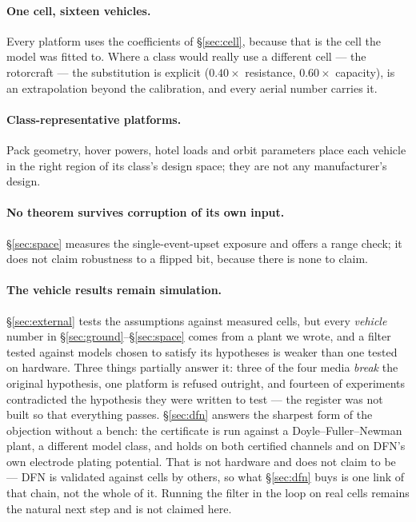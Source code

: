 \documentclass[11pt,letterpaper]{article}
\theoremstyle{definition}
\theoremstyle{remark}
\begin{document}
\paragraph{One cell, sixteen vehicles.} Every platform uses the coefficients of
\S\ref{sec:cell}, because that is the cell the model was fitted to. Where a class would really
use a different cell --- the rotorcraft --- the substitution is explicit ($0.40\times$
resistance, $0.60\times$ capacity), is an extrapolation beyond the calibration, and every aerial
number carries it.

\paragraph{Class-representative platforms.} Pack geometry, hover powers, hotel loads and orbit
parameters place each vehicle in the right region of its class's design space; they are not any
manufacturer's design.

\paragraph{No theorem survives corruption of its own input.} \S\ref{sec:space} measures the
single-event-upset exposure and offers a range check; it does not claim robustness to a flipped
bit, because there is none to claim.

\paragraph{The vehicle results remain simulation.} \S\ref{sec:external} tests the assumptions
against measured cells, but every \emph{vehicle} number in \S\ref{sec:ground}--\S\ref{sec:space}
comes from a plant we wrote, and a filter tested against models chosen to satisfy its hypotheses
is weaker than one tested on hardware. Three things partially answer it: three of the four media
\emph{break} the original hypothesis, one platform is refused outright, and fourteen of
\vExperiments{} experiments contradicted the hypothesis they were written to test --- the
register was not built so that everything passes. \S\ref{sec:dfn} answers the sharpest form of the objection without a bench: the certificate is
run against a Doyle--Fuller--Newman plant, a different model class, and holds on both certified
channels and on DFN's own electrode plating potential. That is not hardware and does not claim to
be --- DFN is validated against cells by others, so what \S\ref{sec:dfn} buys is one link of that
chain, not the whole of it. Running the filter in the loop on real cells remains the natural next
step and is not claimed here.
\end{document}
